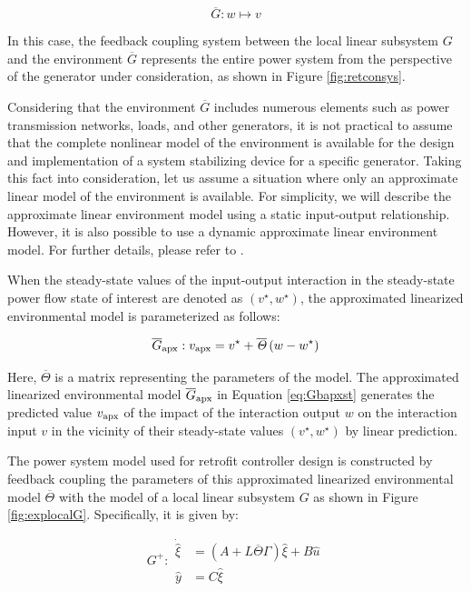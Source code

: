 \documentclass[graybox, envcountchap]{svmult}
\begin{document}
\[
  \overline{G}: w \mapsto v
\]

In this case, the feedback coupling system between the local linear subsystem
$G$ and the environment $\overline{G}$ represents the entire power system from
the perspective of the generator under consideration, as shown in Figure
\ref{fig:retconsys}.

Considering that the environment $\overline{G}$ includes numerous elements such
as power transmission networks, loads, and other generators, it is not practical
to assume that the complete nonlinear model of the environment is available for
the design and implementation of a system stabilizing device for a specific
generator. Taking this fact into consideration, let us assume a situation where
only an approximate linear model of the environment is available. For
simplicity, we will describe the approximate linear environment model using a
static input-output relationship. However, it is also possible to use a dynamic
approximate linear environment model. For further details, please refer to
\cite{ishizaki2019retrofit}.

When the steady-state values of the input-output interaction in the steady-state
power flow state of interest are denoted as $(v^{\star}, w^{\star})$, the
approximated linearized environmental model is parameterized as follows:

\begin{equation}\label{eq:Gbapxst}
  \overline{G}_{\rm apx}:
  v_{\rm apx} = v^{\star} + \overline{\mathit{\Theta}} \left(w-w^{\star}\right)
\end{equation}

Here, $\overline{\mathit{\Theta}}$ is a matrix representing the parameters of
the model. The approximated linearized environmental model $\overline{G}_{\rm
apx}$ in Equation \ref{eq:Gbapxst} generates the predicted value $v_{\rm apx}$ of
the impact of the interaction output $w$ on the interaction input $v$ in the
vicinity of their steady-state values $(v^{\star},w^{\star})$ by linear
prediction.

The power system model used for retrofit controller design is constructed by
feedback coupling the parameters of this approximated linearized environmental
model $\overline{\mathit{\Theta}}$ with the model of a local linear subsystem
$G$ as shown in Figure \ref{fig:explocalG}. Specifically, it is given by:

\begin{equation}\label{eq:Gplus}
  G^+: \begin{aligned} 
    \dot{\hat{\xi}} &=  \left( A+L \overline{\mathit{\Theta}} 
    \mathit{\Gamma} \right) \hat{\xi} + B \hat{u} \\
    \hat{y} & = C \hat{\xi}
  \end{aligned}
\end{equation}
\end{document}
